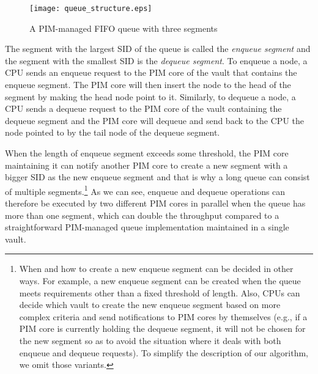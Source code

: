 \documentclass[11pt, letterpaper]{article}   	%
\begin{document}
\begin{figure}[ht!]
\centering
\texttt{[image: queue\_structure.eps]}
\caption{A PIM-managed FIFO queue with three segments}
\label{figure:queue_structure}
\end{figure}

The segment with the largest SID of the queue is called the \emph{enqueue segment}
and the segment with the smallest SID is the \emph{dequeue segment}.
To enqueue a node, a CPU sends an enqueue request to the PIM core of the vault
that contains the enqueue segment.
The PIM core will then insert the node to the head of the segment by making the head node point to it.
Similarly, to dequeue a node, a CPU sends a dequeue request to the PIM core of the vault
containing the dequeue segment and the PIM core will dequeue and send back to the CPU the node 
pointed to by the tail node of the dequeue segment.

When the length of enqueue segment exceeds some threshold, the PIM core maintaining it
can notify another PIM core to create a new segment with a bigger SID as the new enqueue segment 
and that is why a long queue can consist of multiple segments.\footnote{
When and how to create a new enqueue segment can be decided in other ways.
For example, a new enqueue segment can be created
when the queue meets requirements other than a fixed threshold of length.
Also, CPUs can decide which vault to create the new enqueue segment based on more complex criteria
and send notifications to PIM cores by themselves
(e.g., if a PIM core is currently holding the dequeue segment, it will not be chosen for the new segment
so as to avoid the situation where it deals with both enqueue and dequeue requests).
To simplify the description of our algorithm, we omit those variants.}
As we can see, enqueue and dequeue operations can therefore be executed by two different PIM cores 
in parallel when the queue has more than one segment, which can double the throughput compared to 
a straightforward PIM-managed queue implementation maintained in a single vault.  
\end{document}
